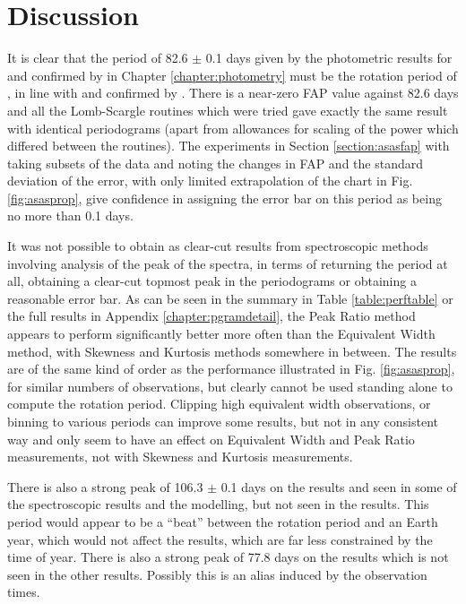 \chapter{Discussion}
\protect\label{chapter:discussion}

It is clear that the period of 82.6 $\pm$ 0.1 days given by the photometric results for {\asas} and confirmed by {\hst}
in Chapter \ref{chapter:photometry} must be the rotation period of \prox, in line with \citet{benedict98} and confirmed
by \citet{kiraga07}. There is a near-zero FAP value against 82.6 days and all the Lomb-Scargle routines which were tried
gave exactly the same result with identical periodograms (apart from allowances for scaling of the power which differed
between the routines). The experiments in Section \ref{section:asasfap} with taking subsets of the data and noting the
changes in FAP and the standard deviation of the error, with only limited extrapolation of the chart in
Fig. \ref{fig:asasprop}, give confidence in assigning the error bar on this period as being no more than 0.1 days.

It was not possible to obtain as clear-cut results from spectroscopic methods involving analysis of the {\ha} peak of
the {\prox} spectra, in terms of returning the period at all, obtaining a clear-cut topmost peak in the periodograms or
obtaining a reasonable error bar. As can be seen in the summary in Table \ref{table:perftable} or the full results in
Appendix \ref{chapter:pgramdetail}, the Peak Ratio method appears to perform significantly better more often than the
Equivalent Width method, with Skewness and Kurtosis methods somewhere in between. The results are of the same kind of
order as the performance illustrated in Fig. \ref{fig:asasprop}, for similar numbers of observations, but clearly cannot
be used standing alone to compute the rotation period. Clipping high equivalent width observations, or binning to
various periods can improve some results, but not in any consistent way and only seem to have an effect on Equivalent
Width and Peak Ratio measurements, not with Skewness and Kurtosis measurements.

There is also a strong peak of 106.3 $\pm$ 0.1 days on the {\asas} results and seen in some of the spectroscopic results
and the modelling, but not seen in the {\hst} results. This period would appear to be a ``beat'' between the rotation
period and an Earth year, which would not affect the {\hst} results, which are far less constrained by the time of
year. There is also a strong peak of 77.8 days on the {\hst} results which is not seen in the other results. Possibly
this is an alias induced by the {\hst} observation times.

